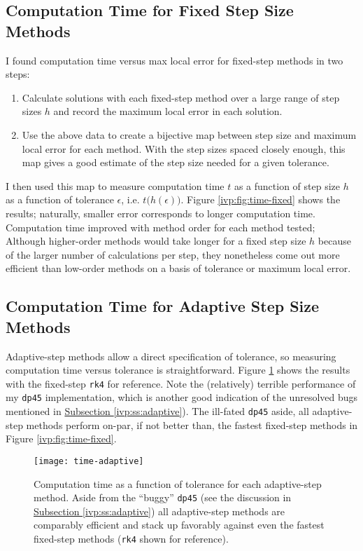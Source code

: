 \documentclass[11pt, a4paper]{article}
\begin{document}
\subsection{Computation Time for Fixed Step Size Methods}
I found computation time versus max local error for fixed-step methods in two steps: 
\begin{enumerate}
	\item Calculate solutions with each fixed-step method over a large range of step sizes $ h $ and record the maximum local error in each solution.
	
	\item Use the above data to create a bijective map between step size and maximum local error for each method. With the step sizes spaced closely enough, this map gives a good estimate of the step size needed for a given tolerance. 
\end{enumerate}
I then used this map to measure computation time $ t $ as a function of step size $ h $ as a function of tolerance $ \epsilon $, i.e. $ t\big(h(\epsilon)\big) $. Figure \ref{ivp:fig:time-fixed} shows the results; naturally, smaller error corresponds to longer computation time. Computation time improved with method order for each method tested;  Although higher-order methods would take longer for a fixed step size $ h $ because of the larger number of calculations per step, they nonetheless come out more efficient than low-order methods on a basis of tolerance or maximum local error.


\subsection{Computation Time for Adaptive Step Size Methods}
Adaptive-step methods allow a direct specification of tolerance, so measuring computation time versus tolerance is straightforward. Figure \ref{ivp:fig:time-adaptive} shows the results with the fixed-step \texttt{rk4} for reference. Note the (relatively) terrible performance of my \texttt{dp45} implementation, which is another good indication of the unresolved bugs mentioned in \hyperref[ivp:ss:adaptive]{Subsection \ref{ivp:ss:adaptive}}). The ill-fated \texttt{dp45} aside, all adaptive-step methods perform on-par, if not better than, the fastest fixed-step methods in Figure \ref{ivp:fig:time-fixed}.

\begin{figure}
\centering
\texttt{[image: time-adaptive]}

\caption{Computation time as a function of tolerance for each adaptive-step method. Aside from the ``buggy'' \texttt{dp45} (see the discussion in \hyperref[ivp:ss:adaptive]{Subsection \ref{ivp:ss:adaptive}}) all adaptive-step methods are comparably efficient and stack up favorably against even the fastest fixed-step methods (\texttt{rk4} shown for reference).} 

\label{ivp:fig:time-adaptive}

\end{figure} 
\end{document}
